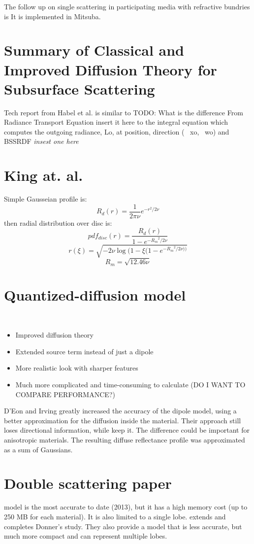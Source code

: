 The follow up on single scattering in participating media with refractive
bundries is \cite{holzschuch:hal-01083246} It is implemented in Mitsuba.

\section{Summary of \textbf{Classical and Improved Diffusion Theory for
Subsurface Scattering}}
Tech report from Habel et al. \cite{habel13cid} is similar to \cite{Habel:2013:PBD:2600890.2600896}
TODO: What is the difference
From Radiance Transport Equation {insert it here} to the integral equation which
computes the outgoing radiance, Lo, at position, direction (~ xo,~ wo) and
BSSRDF \textit{insest one here}

\section{King at. al.}
Simple Gausseian profile is:
\[
R_d(r) = \dfrac{1}{2\pi \nu}e^{-r^2/2\nu}
\]
then radial distribution over disc is:
\[
pdf_{disc}(r) = \dfrac{R_d(r)}{1-e^{-{R_m}^2/2 \nu}}
\]
\[
r(\xi) = \sqrt{-2\nu \log(1-\xi(1-e^{-{R_m}^2/2 \nu))}}
\]
\[
R_m = \sqrt{12.46\nu}
\]


\section{Quantized-diffusion model}
\cite{D'Eon:2011:QMR:1964921.1964951}\\
\begin{itemize}
    \item Improved diffusion theory
    \item Extended source term instead of just a dipole
    \item More realistic look with sharper features
    \item Much more complicated and time-consuming to calculate (DO I WANT TO COMPARE PERFORMANCE?)
\end{itemize}
D’Eon and Irving  greatly increased the accuracy of the dipole model, using a
better approximation for the diffusion inside the material. Their approach still
loses directional information, while \cite{holzschuch:hal-00760054} keep it. The
difference could be important for anisotropic materials.
The resulting diffuse reflectance profile was approximated as a sum of Gaussians.

\section{Double scattering paper}
\cite{Donner:2009:EBM} model is the most accurate to date (2013), but it has a
high memory cost (up to 250 MB for each material). It is also limited to a
single lobe. \cite{holzschuch:hal-00760054} extends and completes Donner's
study. They also provide a model that is less accurate, but much more compact
and can represent multiple lobes.

